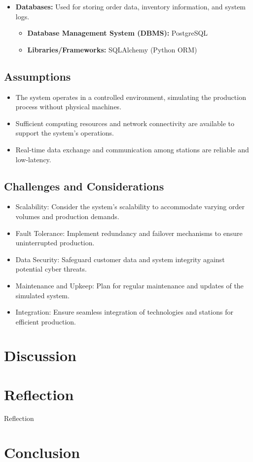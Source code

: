 \documentclass[conference]{IEEEtran}
\begin{document}
\begin{itemize}
    \item \textbf{Databases:} Used for storing order data, inventory information, and system logs.
    \begin{itemize}
        \item \textbf{Database Management System (DBMS):} PostgreSQL
        \item \textbf{Libraries/Frameworks:} SQLAlchemy (Python ORM)
    \end{itemize}
\end{itemize}

\subsection{Assumptions}

\begin{itemize}
    \item The system operates in a controlled environment, simulating the production process without physical machines.
    \item Sufficient computing resources and network connectivity are available to support the system's operations.
    \item Real-time data exchange and communication among stations are reliable and low-latency.
\end{itemize}

\subsection{Challenges and Considerations}

\begin{itemize}
    \item Scalability: Consider the system's scalability to accommodate varying order volumes and production demands.
    \item Fault Tolerance: Implement redundancy and failover mechanisms to ensure uninterrupted production.
    \item Data Security: Safeguard customer data and system integrity against potential cyber threats.
    \item Maintenance and Upkeep: Plan for regular maintenance and updates of the simulated system.
    \item Integration: Ensure seamless integration of technologies and stations for efficient production.
\end{itemize}
\section{Discussion}



\section{Reflection}

Reflection


\section{Conclusion}




\vspace{12pt}
\end{document}
